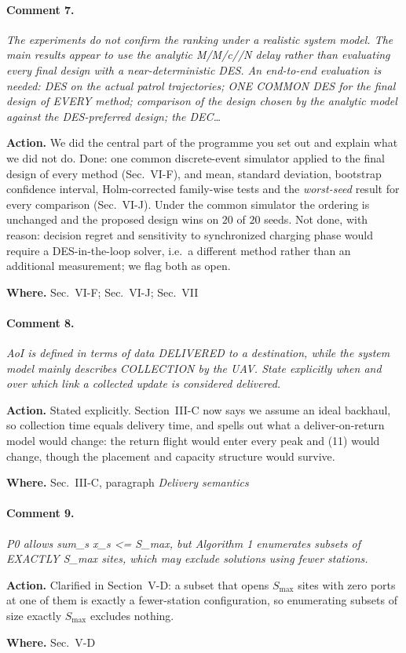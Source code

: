 \documentclass[10pt]{article}
\newcommand{\rev}[1]{\par\medskip\noindent\textit{#1}\par\smallskip}
\newcommand{\act}[2]{\noindent\textbf{Action.} #1\par\noindent\textbf{Where.} #2\par}
\begin{document}
\paragraph{Comment 7.}
\rev{The experiments do not confirm the ranking under a realistic system model. The main results appear to use the analytic M/M/c//N delay rather than evaluating every final design with a near-deterministic DES. An end-to-end evaluation is needed: DES on the actual patrol trajectories; ONE COMMON DES for the final design of EVERY method; comparison of the design chosen by the analytic model against the DES-preferred design; the DEC\dots}
\act{We did the central part of the programme you set out and explain what we did not do. Done: one common discrete-event simulator applied to the final design of every method (Sec.~VI-F), and mean, standard deviation, bootstrap confidence interval, Holm-corrected family-wise tests and the \emph{worst-seed} result for every comparison (Sec.~VI-J). Under the common simulator the ordering is unchanged and the proposed design wins on $20$ of $20$ seeds. Not done, with reason: decision regret and sensitivity to synchronized charging phase would require a DES-in-the-loop solver, i.e.\ a different method rather than an additional measurement; we flag both as open.}{Sec.~VI-F; Sec.~VI-J; Sec.~VII}

\paragraph{Comment 8.}
\rev{AoI is defined in terms of data DELIVERED to a destination, while the system model mainly describes COLLECTION by the UAV. State explicitly when and over which link a collected update is considered delivered.}
\act{Stated explicitly. Section~III-C now says we assume an ideal backhaul, so collection time equals delivery time, and spells out what a deliver-on-return model would change: the return flight would enter every peak and (11) would change, though the placement and capacity structure would survive.}{Sec.~III-C, paragraph \emph{Delivery semantics}}

\paragraph{Comment 9.}
\rev{P0 allows sum\_s x\_s <= S\_max, but Algorithm 1 enumerates subsets of EXACTLY S\_max sites, which may exclude solutions using fewer stations.}
\act{Clarified in Section~V-D: a subset that opens $S_{\max}$ sites with zero ports at one of them is exactly a fewer-station configuration, so enumerating subsets of size exactly $S_{\max}$ excludes nothing.}{Sec.~V-D}
\end{document}
